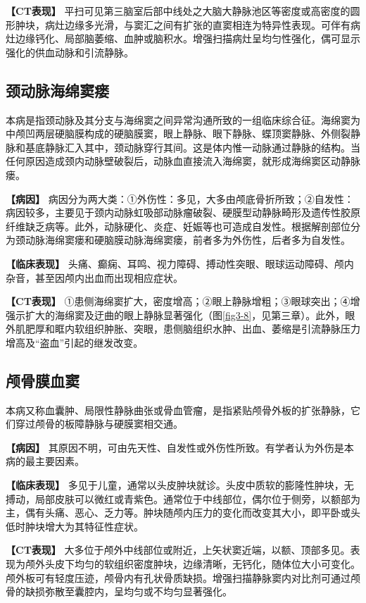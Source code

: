 \textbf{【CT表现】}
平扫可见第三脑室后部中线处之大脑大静脉池区等密度或高密度的圆形肿块，病灶边缘多光滑，与窦汇之间有扩张的直窦相连为特异性表现。可伴有病灶边缘钙化、局部脑萎缩、血肿或脑积水。增强扫描病灶呈均匀性强化，偶可显示强化的供血动脉和引流静脉。

\subsection{颈动脉海绵窦瘘}

本病是指颈动脉及其分支与海绵窦之间异常沟通所致的一组临床综合征。海绵窦为中颅凹两层硬脑膜构成的硬脑膜窦，眼上静脉、眼下静脉、蝶顶窦静脉、外侧裂静脉和基底静脉汇入其中，颈动脉穿行其间。这是体内惟一动脉通过静脉的结构。当任何原因造成颈内动脉壁破裂后，动脉血直接流入海绵窦，就形成海绵窦区动静脉瘘。

\textbf{【病因】}
病因分为两大类：①外伤性：多见，大多由颅底骨折所致；②自发性：病因较多，主要见于颈内动脉虹吸部动脉瘤破裂、硬膜型动静脉畸形及遗传性胶原纤维缺乏病等。此外，动脉硬化、炎症、妊娠等也可造成自发性。根据解剖部位分为颈动脉海绵窦瘘和硬脑膜动脉海绵窦瘘，前者多为外伤性，后者多为自发性。

\textbf{【临床表现】}
头痛、癫痫、耳鸣、视力障碍、搏动性突眼、眼球运动障碍、颅内杂音，甚至因颅内出血而出现相应症状。

\textbf{【CT表现】}
①患侧海绵窦扩大，密度增高；②眼上静脉增粗；③眼球突出；④增强示扩大的海绵窦及迂曲的眼上静脉显著强化（图\ref{fig3-8}，见第三章）。此外，眼外肌肥厚和眶内软组织肿胀、突眼，患侧脑组织水肿、出血、萎缩是引流静脉压力增高及“盗血”引起的继发改变。

\subsection{颅骨膜血窦}

本病又称血囊肿、局限性静脉曲张或骨血管瘤，是指紧贴颅骨外板的扩张静脉，它们穿过颅骨的板障静脉与硬膜窦相交通。

\textbf{【病因】}
其原因不明，可由先天性、自发性或外伤性所致。有学者认为外伤是本病的最主要因素。

\textbf{【临床表现】}
多见于儿童，通常以头皮肿块就诊。头皮中质软的膨隆性肿块，无搏动，局部皮肤可以微红或青紫色。通常位于中线部位，偶尔位于侧旁，以额部为主，偶有头痛、恶心、乏力等。肿块随颅内压力的变化而改变其大小，即平卧或头低时肿块增大为其特征性症状。

\textbf{【CT表现】}
大多位于颅外中线部位或附近，上矢状窦近端，以额、顶部多见。表现为颅外头皮下均匀的软组织密度肿块，边缘清晰，无钙化，随体位大小可变化。颅外板可有轻度压迹，颅骨内有孔状骨质缺损。增强扫描静脉窦内对比剂可通过颅骨的缺损弥散至囊腔内，呈均匀或不均匀显著强化。

